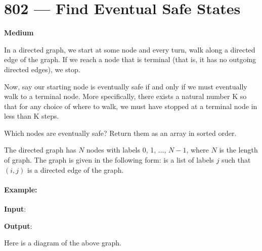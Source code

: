 \section{802 --- Find Eventual Safe States}

\textbf{Medium}

In a directed graph, we start at some node and every turn, walk along a directed edge of the graph. If we reach a node that is terminal (that is, it has no outgoing directed edges), we stop.

Now, say our starting node is eventually safe if and only if we must eventually walk to a terminal node. More specifically, there exists a natural number K so that for any choice of where to walk, we must have stopped at a terminal node in less than K steps.

Which nodes are eventually safe?  Return them as an array in sorted order.

The directed graph has $N$ nodes with labels 0, 1, $\ldots$, $N-1$, where $N$ is the length of graph. The graph is given in the following form:  is a list of labels $j$ such that $ (i, j) $ is a directed edge of the graph.

\paragraph{Example:}
\begin{flushleft}


\textbf{Input}: 

\textbf{Output}: \fcj{[2,4,5,6]}

Here is a diagram of the above graph.

\begin{figure}[H]
\end{figure}

\end{flushleft}

